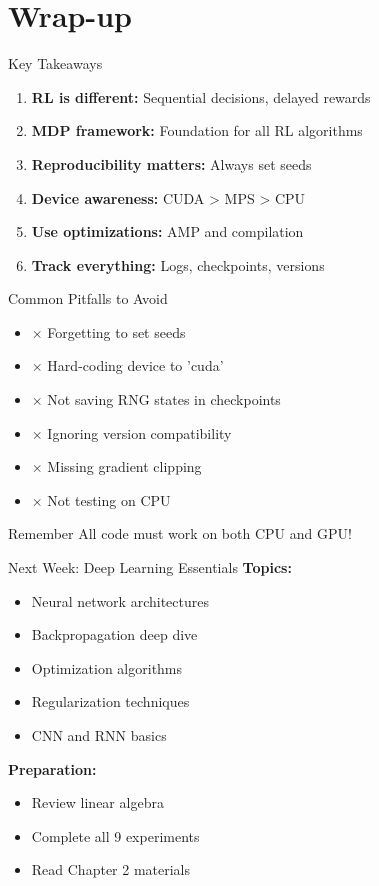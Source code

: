 \documentclass[aspectratio=169,10pt]{beamer}
\begin{document}
\section{Wrap-up}

\begin{frame}{Key Takeaways}
\begin{enumerate}
    \item \textbf{RL is different:} Sequential decisions, delayed rewards
    \item \textbf{MDP framework:} Foundation for all RL algorithms
    \item \textbf{Reproducibility matters:} Always set seeds
    \item \textbf{Device awareness:} CUDA > MPS > CPU
    \item \textbf{Use optimizations:} AMP and compilation
    \item \textbf{Track everything:} Logs, checkpoints, versions
\end{enumerate}
\end{frame}

\begin{frame}{Common Pitfalls to Avoid}
\begin{itemize}
    \item $\times$ Forgetting to set seeds
    \item $\times$ Hard-coding device to 'cuda'
    \item $\times$ Not saving RNG states in checkpoints
    \item $\times$ Ignoring version compatibility
    \item $\times$ Missing gradient clipping
    \item $\times$ Not testing on CPU
\end{itemize}

\begin{block}{Remember}
All code must work on both CPU and GPU!
\end{block}
\end{frame}

\begin{frame}{Next Week: Deep Learning Essentials}
\textbf{Topics:}
\begin{itemize}
    \item Neural network architectures
    \item Backpropagation deep dive
    \item Optimization algorithms
    \item Regularization techniques
    \item CNN and RNN basics
\end{itemize}

\textbf{Preparation:}
\begin{itemize}
    \item Review linear algebra
    \item Complete all 9 experiments
    \item Read Chapter 2 materials
\end{itemize}
\end{frame}
\end{document}
